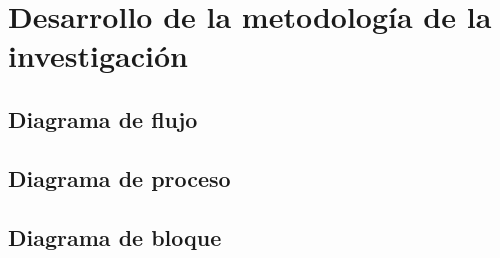 \chapter{Desarrollo de la metodología de la investigación}
\section{Diagrama de flujo}

\section{Diagrama de proceso}

\section{Diagrama de bloque}
